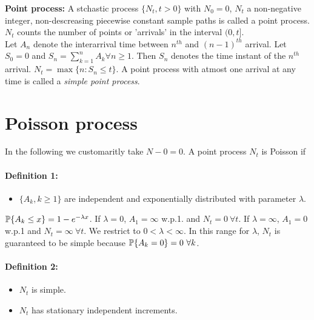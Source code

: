 \documentclass[a4paper,10pt,english]{article}
\begin{document}
\textbf{Point process:} A stchastic process $\{N_t, t > 0\}$ with $N_0 = 0$, $N_t$ a non-negative integer, non-descreasing piecewise constant sample paths is called a point process. $N_t$ counts the number of points or 'arrivals' in the interval $(0,t]$. \\
\indent Let $A_n$ denote the interarrival time between $n^{th}$ and $(n-1)^{th}$ arrival. Let $S_0 = 0$ and $S_n = \sum^n_{k=1} A_k \forall n \geq 1$. Then $S_n$ denotes the time instant of the $n^{th}$ arrival. $N_t = \max\{n: S_n \leq t\}$. A point process with atmost one arrival at any time is called a \textit{simple point process}.
\section{Poisson process}
In the following we customaritly take $N-0 = 0$. A point process $N_t$ is Poisson if 
\paragraph{Definition 1:}{
\begin{itemize}
\item $\{A_k, k \geq 1\}$ are independent and exponentially distributed with parameter $\lambda$.
\end{itemize}
$\P\{A_k \leq x\} = 1 - e^{-\lambda x}$. If $\lambda = 0$, $A_1 = \infty$ w.p.1. and $N_t = 0 \ \forall t$. If $\lambda = \infty$, $A_1 = 0$ w.p.1 and $N_t = \infty \ \forall t$. We restrict to $0<\lambda<\infty$. In this range for $\lambda$, $N_t$ is guaranteed to be simple because $\P\{A_k = 0\} = 0 \ \forall k$.
}
\paragraph{Definition 2:}{
\begin{itemize}
\item $N_t$ is simple.
\item $N_t$ has stationary independent increments.
\end{itemize}
}
\end{document}
